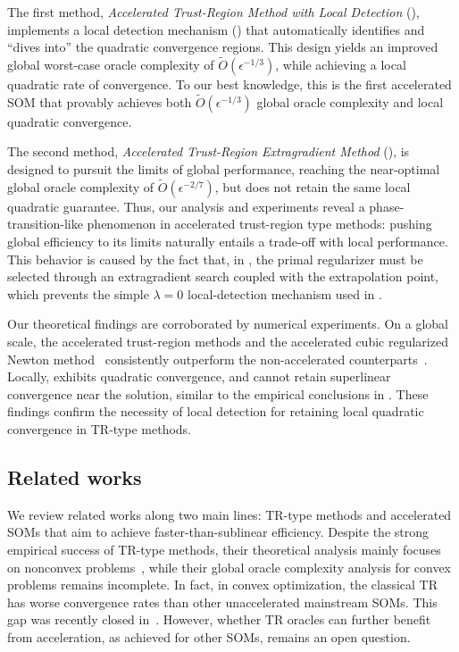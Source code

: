 \documentclass{article}
\numberwithin{equation}{section}
\newcommand{\atrms}{\Cref{alg.ms accelerated utr}}
\numberwithin{equation}{section}
\begin{document}
The first method, \emph{Accelerated Trust-Region Method with Local Detection} (), implements a local detection mechanism () that automatically identifies and ``dives into'' the quadratic convergence regions. This design yields an improved global worst-case oracle complexity of $\tilde{O}(\epsilon^{-1/3})$, while achieving a local quadratic rate of convergence. To our best knowledge, this is the first accelerated SOM that provably achieves both $\tilde{O}(\epsilon^{-1/3})$ global oracle complexity and local quadratic convergence.

The second method, \emph{Accelerated Trust-Region Extragradient Method} (), is designed to pursuit the limits of global performance, reaching the near-optimal global oracle complexity of $\tilde{O}(\epsilon^{-2/7})$, but does not retain the same local quadratic guarantee. Thus, our analysis and experiments reveal a phase-transition-like phenomenon in accelerated trust-region type methods: pushing global efficiency to its limits naturally entails a trade-off with local performance.
This behavior is caused by the fact that, in , the primal regularizer must be selected through an extragradient search coupled with the extrapolation point, which prevents the simple $\lambda=0$ local-detection mechanism used in .

Our theoretical findings are corroborated by numerical experiments. On a global scale, the accelerated trust-region methods and the accelerated cubic regularized Newton method~\cite{nesterov2008accelerating} consistently outperform the non-accelerated counterparts~\cite{jiang2026beyond,nesterov2006cubic}. Locally,  exhibits quadratic convergence, and \atrms{} cannot retain superlinear convergence near the solution, similar to the empirical conclusions in \cite{carmon2022optimal,jiang2024accelerated,huang2024inexact}. These findings confirm the necessity of local detection for retaining local quadratic convergence in TR-type methods.

\subsection{Related works}
We review related works along two main lines: TR-type methods and accelerated SOMs that aim to achieve faster-than-sublinear efficiency. Despite the strong empirical success of TR-type methods, their theoretical analysis mainly focuses on nonconvex problems~\cite{ye2005second,curtis2017trust,curtis2021trust,zhang2025homogeneous,hamad2022consistently,grapiglia2015on,hamad2024simple,curtis2023worst_i,ouyang2025trust}, while their global oracle complexity analysis for convex problems remains incomplete.
In fact, in convex optimization, the classical TR has worse convergence rates than other unaccelerated mainstream SOMs. This gap was recently closed in~\cite{jiang2026beyond}. However, whether TR oracles can further benefit from acceleration, as achieved for other SOMs, remains an open question.
\end{document}
